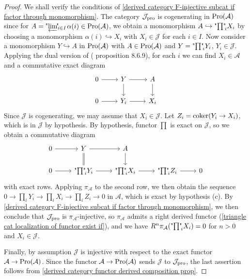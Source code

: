 \begin{proof}
We shall verify the conditions of \cref{derived category F-injective subcat if factor through monomorphism}. The category $\mathcal{J}_{\mathrm{pro}}$ is cogenerating in $\mathrm{Pro}(\mathcal{A})$ since for $A=\text{"$\varprojlim$\!"}\!_{i\in I}\hspace*{1pt}\alpha(i)\in\mathrm{Pro}(\mathcal{A})$, we obtain a monomorphism $A\hookrightarrow\text{"$\prod$"\!}_iX_i$ by choosing a monomorphism $\alpha(i)\hookrightarrow X_i$ with $X_i\in\mathcal{J}$ for each $i\in I$. Now consider a monomorphism $Y\hookrightarrow A$ in $\mathrm{Pro}(\mathcal{A})$ with $A\in\mathrm{Pro}(\mathcal{A})$ and $Y=\text{"$\prod$"\!}_iY_i$, $Y_i\in\mathcal{J}$. Applying the dual version of (\cite{kashiwara_SAC} proposition 8.6.9), for each $i$ we can find $X_i\in\mathcal{A}$ and a commutative exact diagram
\[\begin{tikzcd}
0\ar[r]&Y\ar[r]\ar[d]&A\ar[d]\\
0\ar[r]&Y_i\ar[r]&X_i
\end{tikzcd}\]
Since $\mathcal{J}$ is cogenerating, we may assume that $X_i\in\mathcal{J}$. Let $Z_i=\operatorname{coker}(Y_i\to X_i)$, which is in $\mathcal{J}$ by hypothesis. By hypothesis, functor $\prod$ is exact on $\mathcal{J}$, so we obtain a commutative diagram
\[\begin{tikzcd}
0\ar[r]&Y\ar[r]\ar[d,equal]&A\ar[d]\\
0\ar[r]&\text{"$\prod$"\!}_iY_i\ar[r]&\text{"$\prod$"\!}_iX_i\ar[r]&\text{"$\prod$"\!}_iZ_i\ar[r]&0
\end{tikzcd}\]
with exact rows. Applying $\pi_\mathcal{A}$ to the second row, we then obtain the sequence $0\to \prod_iY_i\to \prod_iX_i\to\prod_iZ_i\to 0$ in $\mathcal{A}$, which is exact by hypothesis (c). By \cref{derived category F-injective subcat if factor through monomorphism}, we then conclude that $\mathcal{J}_{\mathrm{pro}}$ is $\pi_\mathcal{A}$-injective, so $\pi_\mathcal{A}$ admits a right derived functor (\cref{triangle cat localization of functor exist if}), and we have $R^n\pi_\mathcal{A}(\text{"$\prod$"\!}_iX_i)=0$ for $n>0$ and $X_i\in\mathcal{J}$.\par
Finally, by assumption $\mathcal{J}$ is injective with respect to the exact functor $\mathcal{A}\to\mathrm{Pro}(\mathcal{A})$. Since the functor $\mathcal{A}\to\mathrm{Pro}(\mathcal{A})$ sends $\mathcal{J}$ to $\mathcal{J}_{\mathrm{pro}}$, the last assertion follows from \cref{derived category functor derived composition prop}.
\end{proof}

